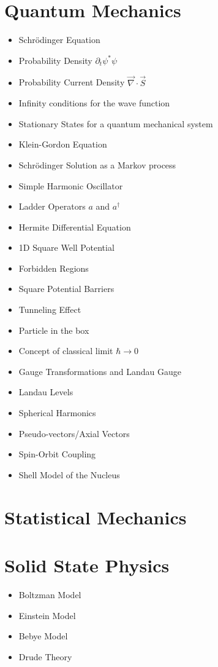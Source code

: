\documentclass[10pt]{article}
\begin{document}
\section{Quantum Mechanics}
\begin{itemize}
	\item Schr\"odinger Equation
	\item Probability Density $\partial_t \psi^*\psi$
	\item Probability Current Density $\vec{\nabla}\cdot\vec{S}$
	\item Infinity conditions for the wave function
	\item Stationary States for a quantum mechanical system
	\item Klein-Gordon Equation
	\item Schr\"odinger Solution as a Markov process
	\item Simple Harmonic Oscillator
	\item Ladder Operators $a$ and $a^{\dag}$
	\item Hermite Differential Equation
	\item 1D Square Well Potential
	\item Forbidden Regions
	\item Square Potential Barriers
	\item Tunneling Effect
	\item Particle in the box
	\item Concept of classical limit $\hbar \to 0$
	\item Gauge Transformations and Landau Gauge
	\item Landau Levels
	\item Spherical Harmonics
	\item Pseudo-vectors/Axial Vectors
	\item Spin-Orbit Coupling
	\item Shell Model of the Nucleus
	\end{itemize}

\section{Statistical Mechanics}
\begin{refsection}
	\nocite{kittel1998thermal}
\printbibliography[heading=subbibliography,title={Recommended Books}]
\end{refsection}

\section{Solid State Physics}
\begin{itemize}
	\item Boltzman Model
	\item Einstein Model
	\item Bebye Model
	\item Drude Theory
\end{itemize}
\begin{refsection}
	\nocite{kittel2005introduction}
\printbibliography[heading=subbibliography,title={Recommended Books}]
\end{refsection}
\end{document}

